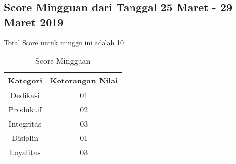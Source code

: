 \subsection{Score Mingguan dari Tanggal 25 Maret - 29 Maret 2019}
Total Score untuk minggu ini adalah 10

\begin{table}[h]
\caption{Score Mingguan}
\centering
\begin{tabular}{|c|c|}
\hline
\textbf{Kategori}&\textbf{Keterangan Nilai}\\
\hline
Dedikasi&01\\
\hline
Produktif&02\\
\hline
Integritas&03\\
\hline
Disiplin&01\\
\hline
Loyalitas&03\\
\hline
\end{tabular}
\label{table:score mingguan}
\end{table}